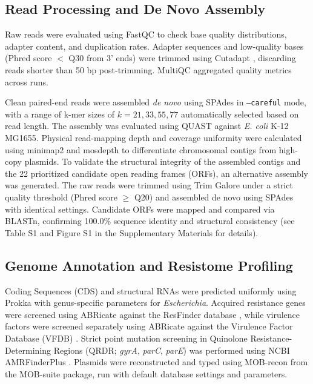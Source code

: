 \documentclass[pdflatex,sn-mathphys-num]{sn-jnl}
\begin{document}
\subsection{Read Processing and De Novo Assembly}\label{subsec:assembly}
Raw reads were evaluated using FastQC \cite{andrews2010fastqc} to check base quality distributions, adapter content, and duplication rates. Adapter sequences and low-quality bases (Phred score \(<\) Q30 from 3' ends) were trimmed using Cutadapt \cite{martin2011cutadapt}, discarding reads shorter than 50 bp post-trimming. MultiQC \cite{ewels2016multiqc} aggregated quality metrics across runs.

Clean paired-end reads were assembled \textit{de novo} using SPAdes \cite{bankevich2012spades} in \texttt{--careful} mode, with a range of k-mer sizes of $k = 21, 33, 55, 77$ automatically selected based on read length. The assembly was evaluated using QUAST \cite{gurevich2013quast} against \textit{E. coli} K-12 MG1655. Physical read-mapping depth and coverage uniformity were calculated using minimap2 \cite{li2018minimap2} and mosdepth \cite{pedersen2018mosdepth} to differentiate chromosomal contigs from high-copy plasmids. To validate the structural integrity of the assembled contigs and the 22 prioritized candidate open reading frames (ORFs), an alternative assembly was generated. The raw reads were trimmed using Trim Galore under a strict quality threshold (Phred score $\ge$ Q20) and assembled de novo using SPAdes with identical settings. Candidate ORFs were mapped and compared via BLASTn, confirming 100.0\% sequence identity and structural consistency (see Table S1 and Figure S1 in the Supplementary Materials for details).

\subsection{Genome Annotation and Resistome Profiling}\label{subsec:annotation}
Coding Sequences (CDS) and structural RNAs were predicted uniformly using Prokka \cite{seemann2014prokka} with genus-specific parameters for \textit{Escherichia}. Acquired resistance genes were screened using ABRicate \cite{seemann2020abricate} against the ResFinder database \cite{bortolaia2020resfinder}, while virulence factors were screened separately using ABRicate against the Virulence Factor Database (VFDB) \cite{liu2019vfdb}. Strict point mutation screening in Quinolone Resistance-Determining Regions (QRDR; \textit{gyrA}, \textit{parC}, \textit{parE}) was performed using NCBI AMRFinderPlus \cite{feldgarden2021amr}. Plasmids were reconstructed and typed using MOB-recon from the MOB-suite package, run with default database settings and parameters.
\end{document}
